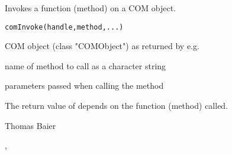 \begin{Description}\relax
Invokes a function (method) on a COM object.
\end{Description}
\begin{Usage}
\begin{verbatim}
comInvoke(handle,method,...)
\end{verbatim}
\end{Usage}
\begin{Arguments}
\begin{ldescription}
\item[\code{handle}] COM object (class "COMObject") as returned by e.g.
\item[\code{method}] name of method to call as a character string
\item[\code{...}] parameters passed when calling the method
\end{ldescription}
\end{Arguments}
\begin{Value}
The return value of  depends on the function (method) called.
\end{Value}
\begin{Author}\relax
Thomas Baier
\end{Author}
\begin{SeeAlso}\relax
{}, 
\end{SeeAlso}

